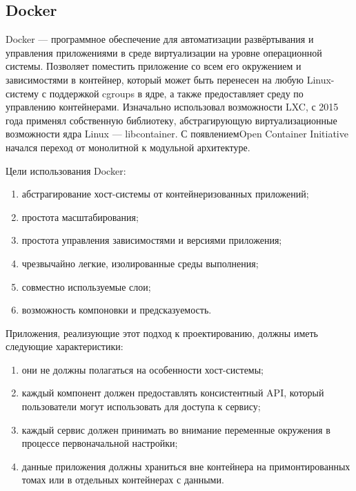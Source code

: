 \subsection{Docker}
\label{sec:development:docker}

Docker — программное обеспечение для автоматизации развёртывания и управления приложениями в среде виртуализации на уровне операционной системы. Позволяет поместить приложение со всем его окружением и зависимостями в контейнер, который может быть перенесен на любую Linux-систему с поддержкой cgroups в ядре, а также предоставляет среду по управлению контейнерами. Изначально использовал возможности LXC, с 2015 года применял собственную библиотеку, абстрагирующую виртуализационные возможности ядра Linux — libcontainer. С появлением ​Open Container Initiative начался переход от монолитной к модульной архитектуре.

Цели использования Docker:
\begin{enumerate}
  \item абстрагирование хост-системы от контейнеризованных приложений;
  \item простота масштабирования;
  \item простота управления зависимостями и версиями приложения;
  \item чрезвычайно легкие, изолированные среды выполнения;
  \item совместно используемые слои;
  \item возможность компоновки и предсказуемость.
\end{enumerate}

Приложения, реализующие этот подход к проектированию, должны иметь следующие характеристики:
\begin{enumerate}
  \item они не должны полагаться на особенности хост-системы;
  \item каждый компонент должен предоставлять консистентный API, который пользователи могут использовать для доступа к сервису;
  \item каждый сервис должен принимать во внимание переменные окружения в процессе первоначальной настройки;
  \item данные приложения должны храниться вне контейнера на примонтированных томах или в отдельных контейнерах с данными.
\end{enumerate}
